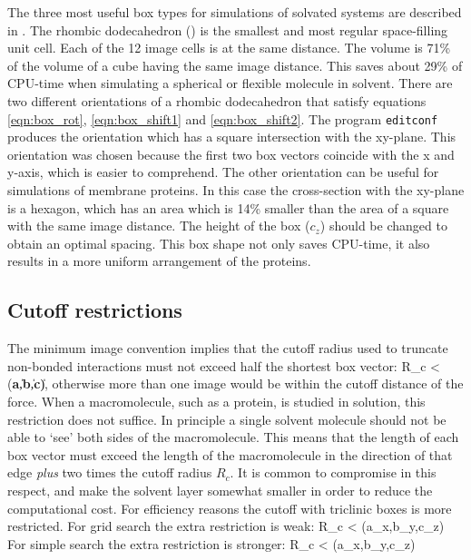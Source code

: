 The three most useful box types for simulations of solvated systems
are described in .  The rhombic dodecahedron
() is the smallest and most regular space-filling
unit cell. Each of the 12 image cells is at the same distance.  The
volume is 71\% of the volume of a cube having the same image
distance. This saves about 29\% of CPU-time when simulating a
spherical or flexible molecule in solvent. There are two different
orientations of a rhombic dodecahedron that satisfy equations
\ref{eqn:box_rot}, \ref{eqn:box_shift1} and \ref{eqn:box_shift2}.
The program {\tt editconf} produces the orientation
which has a square intersection with the xy-plane.  This orientation
was chosen because the first two box vectors coincide with the x and
y-axis, which is easier to comprehend. The other orientation can be
useful for simulations of membrane proteins. In this case the
cross-section with the xy-plane is a hexagon, which has an area which
is 14\% smaller than the area of a square with the same image
distance.  The height of the box ($c_z$) should be changed to obtain
an optimal spacing.  This box shape not only saves CPU-time, it
also results in a more uniform arrangement of the proteins.

\subsection{Cutoff restrictions}
The minimum image convention implies that the cutoff radius used to
truncate non-bonded interactions must not exceed half the shortest box
vector:
\beq
\label{eqn:physicalrc}
  R_c < \half \min(\|{\bf a}\|,\|{\bf b}\|,\|{\bf c}\|),
\eeq
otherwise more than one image would be within the cutoff distance of
the force. When a macromolecule, such as a protein, is studied in
solution,  this restriction does not suffice. In principle a single
solvent  molecule should not be able
to `see' both sides of the macromolecule. This means that the length of
each box vector must exceed the length of the macromolecule in the
direction of that edge {\em plus} two times the cutoff radius $R_c$.
It is common to compromise in this respect, and make the solvent layer
somewhat smaller in order to reduce the computational cost.
For efficiency reasons the cutoff with triclinic boxes is more restricted.
For grid search the extra restriction is weak:
\beq
\label{eqn:gridrc}
R_c < \min(a_x,b_y,c_z)
\eeq
For simple search the extra restriction is stronger:
\beq
\label{eqn:simplerc}
R_c < \half \min(a_x,b_y,c_z)
\eeq

